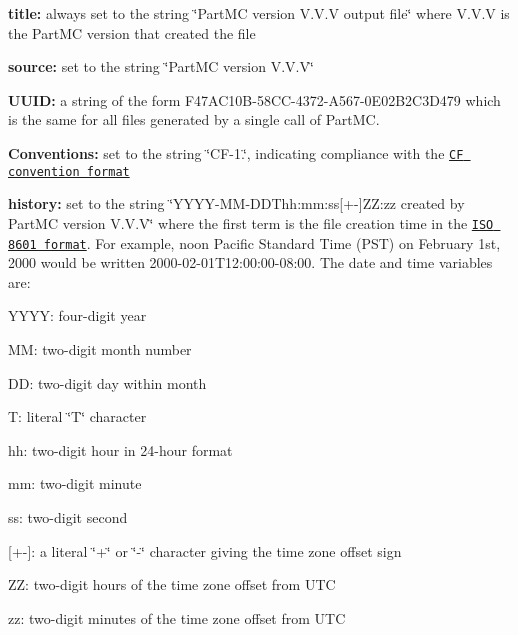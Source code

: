 \begin{DoxyItemize}
\item {\bfseries title\+:} always set to the string \char`\"{}\+Part\+M\+C version V.\+V.\+V
     output file\char`\"{} where V.\+V.\+V is the Part\+MC version that created the file
\item {\bfseries source\+:} set to the string \char`\"{}\+Part\+M\+C version V.\+V.\+V\char`\"{}
\item {\bfseries U\+U\+ID\+:} a string of the form F47\+A\+C10\+B-\/58\+C\+C-\/4372-\/\+A567-\/0\+E02\+B2\+C3\+D479 which is the same for all files generated by a single call of Part\+MC.
\item {\bfseries Conventions\+:} set to the string \char`\"{}\+C\+F-\/1.\char`\"{}, indicating compliance with the \href{http://cf-pcmdi.llnl.gov/documents/cf-conventions/1.4}{\tt CF convention format}
\item {\bfseries history\+:} set to the string \char`\"{}\+Y\+Y\+Y\+Y-\/\+M\+M-\/\+D\+D\+Thh\+:mm\+:ss\mbox{[}+-\/\mbox{]}\+Z\+Z\+:zz
     created by Part\+M\+C version V.\+V.\+V\char`\"{} where the first term is the file creation time in the \href{http://en.wikipedia.org/wiki/ISO_8601}{\tt I\+SO 8601 format}. For example, noon Pacific Standard Time (P\+ST) on February 1st, 2000 would be written 2000-\/02-\/01\+T12\+:00\+:00-\/08\+:00. The date and time variables are\+:
\begin{DoxyItemize}
\item Y\+Y\+YY\+: four-\/digit year
\item MM\+: two-\/digit month number
\item DD\+: two-\/digit day within month
\item T\+: literal \char`\"{}\+T\char`\"{} character
\item hh\+: two-\/digit hour in 24-\/hour format
\item mm\+: two-\/digit minute
\item ss\+: two-\/digit second
\item \mbox{[}+-\/\mbox{]}\+: a literal \char`\"{}+\char`\"{} or \char`\"{}-\/\char`\"{} character giving the time zone offset sign
\item ZZ\+: two-\/digit hours of the time zone offset from U\+TC
\item zz\+: two-\/digit minutes of the time zone offset from U\+TC
\end{DoxyItemize}
\end{DoxyItemize}

